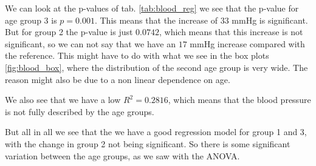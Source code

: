 \documentclass[a4paper,norsk, 10pt]{article}
\begin{document}
We can look at the p-values of tab. \ref{tab:blood_reg} we see that the p-value for age group 3 is $p=0.001$. This means that the increase of $33$ mmHg is significant. But for group 2 the p-value is just $0.0742$, which means that this increase is not significant, so we can not say that we have an $17$ mmHg increase compared  with the reference. This might have to do with what we see in the box plots \ref{fig:blood_box}, where the distribution of the second age group is very wide. The reason might also be due to a non linear dependence on age.

We also see that we have a low $R^2 = 0.2816$, which means that the blood pressure is not fully described by the age groups.

But all in all we see that the we have a good regression model for group 1 and 3, with the change in group 2 not being significant. So there is some significant variation between the age groups, as we saw with the ANOVA. 
\end{document}
